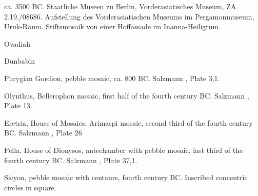 \documentclass{article}
\begin{document}
ca. 3500 BC. Staatliche Museen zu Berlin, Vorderasiatisches Museum, ZA 2.19./08686.
Aufstellung des Vorderasiatischen Museums im Pergamonmuseum, Uruk-Raum.
Stiftsmosaik von einer Hoffassade im Inanna-Heiligtum.

Ovadiah \cite{ovadiah}

Dunbabin \cite{dunbabin}

Phrygian Gordion, pebble mosaic, ca. 800 BC. Salzmann \cite{salzmann}, Plate 3,1.

Olynthus, Bellerophon mosaic, first half of the fourth century BC. Salzmann \cite{salzmann}, Plate 13.

Eretria, House of Mosaics, Arimaspi mosaic, second third of the fourth century BC. Salzmann \cite{salzmann}, Plate 26

Pella, House of Dionysos, antechamber with pebble mosaic, last third of the fourth century BC. Salzmann \cite{salzmann},
Plate 37,1. 

Sicyon, pebble mosaic with centaurs, fourth century BC. Inscribed concentric circles in square.








\end{document}

